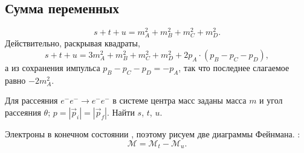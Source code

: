 \documentclass[../final.tex]{subfiles}
\begin{document}
\subsection*{Сумма переменных}

\begin{equation*}
    s+t+u=m_A^2+m_B^2+m_C^2+m_D^2.
\end{equation*}
Действительно, раскрывая квадраты,
\begin{equation*}
    s+t+u=3m_A^2+m_B^2+m_C^2+m_D^2
    +2p_A\cdot(p_B-p_C-p_D),
\end{equation*}
а из сохранения импульса $p_B-p_C-p_D=-p_A$, так что последнее слагаемое
равно $-2m_A^2$.

\label{task:moller_mandelstam_sem7}

\condition
Для рассеяния $e^-e^-\to e^-e^-$ в системе центра масс заданы
масса $m$ и угол рассеяния $\theta$; $p=|\vec p_i|=|\vec p_f|$.
Найти $s$, $t$, $u$.

\solution
Электроны в конечном состоянии , поэтому рисуем
две диаграммы Фейнмана. :
\begin{equation*}
    \mathcal M=\mathcal M_t-\mathcal M_u.
\end{equation*}
\end{document}

